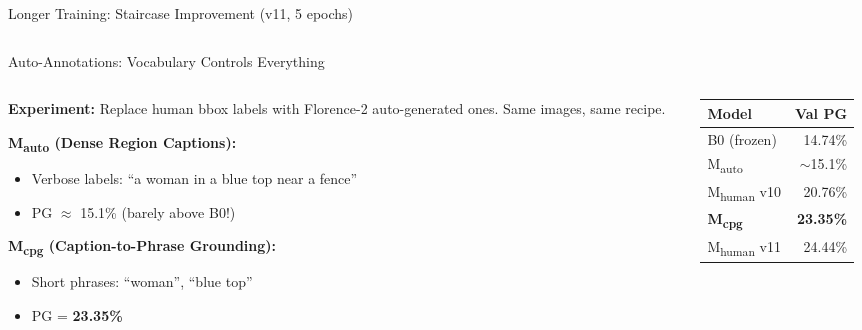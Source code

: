 \documentclass[aspectratio=169,12pt]{beamer}
\newcommand{\plus}[1]{{\color{positive}+#1}}
\newcommand{\mhuman}{M\textsubscript{human}}
\newcommand{\mauto}{M\textsubscript{auto}}
\newcommand{\mcpg}{M\textsubscript{cpg}}
\begin{document}
\begin{frame}{Longer Training: Staircase Improvement (v11, 5 epochs)}
\begin{columns}[T]
\begin{column}{0.45\textwidth}
\begin{center}
      \end{center}
    \end{column}
  \end{columns}
\end{frame}

\begin{frame}{Auto-Annotations: Vocabulary Controls Everything}
  \begin{columns}[T]
    \begin{column}{0.55\textwidth}
      \textbf{Experiment:} Replace human bbox labels with Florence-2 auto-generated ones.
      Same images, same recipe.

      \vspace{0.5em}
      \textbf{\mauto{} (Dense Region Captions):}
      \begin{itemize}
        \item Verbose labels: ``a woman in a blue top near a fence''
        \item PG $\approx$ 15.1\% \quad (barely above B0!)
      \end{itemize}

      \vspace{0.5em}
      \textbf{\mcpg{} (Caption-to-Phrase Grounding):}
      \begin{itemize}
        \item Short phrases: ``woman'', ``blue top''
        \item PG = \textbf{23.35\%} \quad \plus{8.25 pp vs \mauto{}}
      \end{itemize}
    \end{column}
    \begin{column}{0.42\textwidth}
      \begin{center}
        \begin{tabular}{l r}
          \toprule
          Model & Val PG \\
          \midrule
          B0 (frozen) & 14.74\% \\
          \mauto{} & $\sim$15.1\% \\
          \mhuman{} v10 & 20.76\% \\
          \textbf{\mcpg{}} & \textbf{23.35\%} \\
          \mhuman{} v11 & 24.44\% \\
          \bottomrule
        \end{tabular}
      \end{center}


\end{column}
\end{columns}
\end{frame}
\end{document}
